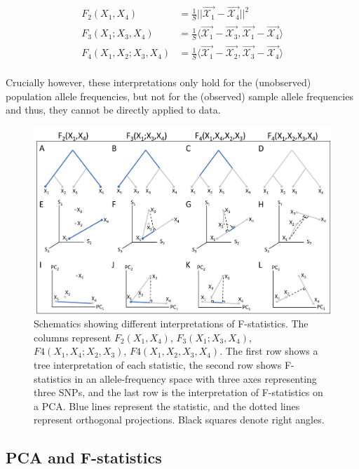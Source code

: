 \documentclass[12pt, letterpaper]{article}
\begin{document}
\begin{align}\label{eq:f_geometric}
F_2(X_1,X_4) &= \frac{1}{S}||\Vec{\mathcal{X}_{1}} - \vec{\mathcal{X}_{4}}||^2\nonumber\\
F_3(X_1;X_3,X_4) &= \frac{1}{S} \langle\vec{\mathcal{X}_{1}} - \vec{\mathcal{X}_{3}},\vec{\mathcal{X}_{1}} - \vec{\mathcal{X}_{4}}\rangle\nonumber\\
F_4(X_1,X_2;X_3,X_4) &= \frac{1}{S}\langle\vec{\mathcal{X}_{1}} - \vec{\mathcal{X}_{2}},\vec{\mathcal{X}_{3}} - \vec{\mathcal{X}_{4}}\rangle\nonumber\\
\end{align}

Crucially however, these interpretations only hold for the (unobserved) population allele frequencies, but not for the (observed) sample allele frequencies and thus, they cannot be directly applied to data.


\begin{figure}[ht!]
    \includegraphics[width=16.5cm]{ppt/overview.png}
    \centering
    \caption{Schematics showing different interpretations of F-statistics. The columns represent $F_2(X_1,X_4)$, $F_3(X_1;X_3,X_4)$, $F4(X_1,X_4;X_2,X_3)$, $F4(X_1,X_2,X_3,X_4)$. The first row shows a tree interpretation of each statistic, the second row shows F-statistics in an allele-frequency space with three axes representing three SNPs, and the last row is the interpretation of F-statistics on a PCA. Blue lines represent the statistic, and the dotted lines represent orthogonal projections. Black squares denote right angles.}
    \label{fig2:overview}
\end{figure}


\subsection{PCA and F-statistics}\label{theory-pca-fstats}
\end{document}
